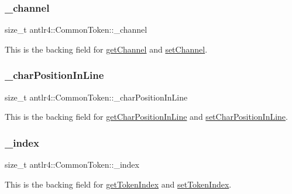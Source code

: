 \subsubsection{\texorpdfstring{\+\_\+channel}{\_channel}}
{\footnotesize\ttfamily size\+\_\+t antlr4\+::\+Common\+Token\+::\+\_\+channel\hspace{0.3cm}{\ttfamily [protected]}}

This is the backing field for \hyperlink{classantlr4_1_1CommonToken_a30b47e4ec7c1b02bde9b38530d8fe358}{get\+Channel} and \hyperlink{}{set\+Channel}. \mbox{\label{classantlr4_1_1CommonToken_a56bf632f84aa6876618eb05b06bb17d3}} 
\subsubsection{\texorpdfstring{\+\_\+char\+Position\+In\+Line}{\_charPositionInLine}}
{\footnotesize\ttfamily size\+\_\+t antlr4\+::\+Common\+Token\+::\+\_\+char\+Position\+In\+Line\hspace{0.3cm}{\ttfamily [protected]}}

This is the backing field for \hyperlink{classantlr4_1_1CommonToken_aa1d6ebf145f7eac65ac809f273fff0c7}{get\+Char\+Position\+In\+Line} and \hyperlink{}{set\+Char\+Position\+In\+Line}. \mbox{\label{classantlr4_1_1CommonToken_a9a10b67e5076290d167f40d72ae9ebe6}} 
\subsubsection{\texorpdfstring{\+\_\+index}{\_index}}
{\footnotesize\ttfamily size\+\_\+t antlr4\+::\+Common\+Token\+::\+\_\+index\hspace{0.3cm}{\ttfamily [protected]}}

This is the backing field for \hyperlink{classantlr4_1_1CommonToken_ae94edeb1c320914502ca30a89332c5ef}{get\+Token\+Index} and \hyperlink{}{set\+Token\+Index}. \mbox{\label{classantlr4_1_1CommonToken_abd24cb6b67e6b2c9265946edf79a0fcb}} 

